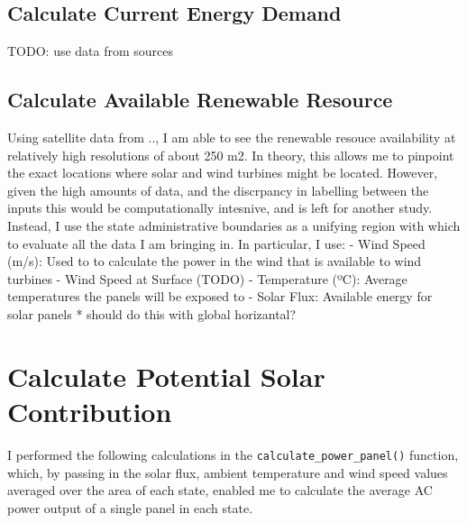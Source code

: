 \documentclass{scrartcl}
\begin{document}
\hypertarget{calculate-current-energy-demand}{%
\subsection{Calculate Current Energy
Demand}\label{calculate-current-energy-demand}}

TODO: use data from sources

\hypertarget{calculate-available-renewable-resource}{%
\subsection{Calculate Available Renewable
Resource}\label{calculate-available-renewable-resource}}

Using satellite data from .., I am able to see the renewable resouce
availability at relatively high resolutions of about 250 m2. In theory,
this allows me to pinpoint the exact locations where solar and wind
turbines might be located. However, given the high amounts of data, and
the discrpancy in labelling between the inputs this would be
computationally intesnive, and is left for another study. Instead, I use
the state administrative boundaries as a unifying region with which to
evaluate all the data I am bringing in. In particular, I use: - Wind
Speed (m/s): Used to to calculate the power in the wind that is
available to wind turbines - Wind Speed at Surface (TODO) - Temperature
(ºC): Average temperatures the panels will be exposed to - Solar Flux:
Available energy for solar panels * should do this with global
horizantal?

\begin{Shaded}
\begin{Highlighting}[]
\CommentTok{\# }
\end{Highlighting}
\end{Shaded}

\hypertarget{calculate-potential-solar-contribution}{%
\section{Calculate Potential Solar
Contribution}\label{calculate-potential-solar-contribution}}

I performed the following calculations in the
\texttt{calculate\_power\_panel()} function, which, by passing in the
solar flux, ambient temperature and wind speed values averaged over the
area of each state, enabled me to calculate the average AC power output
of a single panel in each state.
\end{document}
